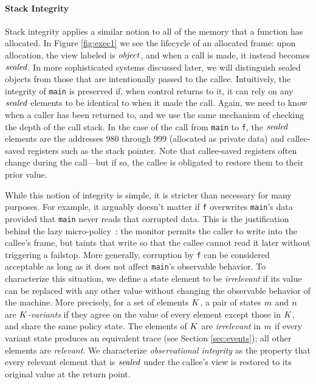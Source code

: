 \documentclass[10pt,conference]{ieeetran}%
\theoremstyle{definition}
\begin{document}
\paragraph*{Stack Integrity}

Stack integrity applies a similar  notion to all of the memory that a function has
allocated. In Figure \ref{fig:exec1} we see the lifecycle of an allocated frame:
upon allocation, the view labeled is \(\mathit{object}\), and when a call is made, it instead
becomes \(\mathit{sealed}\). In more sophisticated systems discussed later, we will distinguish
sealed objects from those that are intentionally passed to the callee. 
Intuitively, the integrity of {\tt main}
is preserved if, when control returns to it, it can rely on any \(\mathit{sealed}\) elements
to be identical to when it made the call.
%
Again, we need to know when a caller has been returned to,
and we use the same mechanism of checking the depth of the call stack.
%
In the case of the call from {\tt main} to {\tt f}, the \(\mathit{sealed}\) elements are the
addresses 980 through 999 (allocated as private data) and callee-saved registers such as
the stack pointer. Note that callee-saved registers often change
during the call---but if so, the callee is obligated to restore them to their prior value.

While this notion of integrity is simple, it is stricter than necessary for many purposes.
For example, it arguably doesn't matter if {\tt f} overwrites {\tt main}'s data provided that {\tt main} never
reads that corrupted data.  This is the justification behind the lazy micro-policy~\cite{??}:
the monitor permits the caller to write into the
callee's frame, but taints that write so that the callee cannot read it later without
triggering a failstop. More generally, corruption by {\tt f} can be considered acceptable
as long as it does not affect {\tt main}'s observable behavior. 
To characterize this situation, we define a state element to be \emph{irrelevant}
if its value can be replaced with any other value without changing the observable behavior
of the machine. More precisely, for a set of elements \(K\),
a pair of states \(m\) and \(n\)
are {\em \(K\)-variants} if they agree on the value of every
element except those in \(K\), and share the same policy state.
The elements of \(K\) are \emph{irrelevant} in \(m\) if every variant state produces an equivalent trace
(see Section \ref{sec:events}); all other elements are \emph{relevant}.
We characterize \emph{observational integrity} as the property that
every relevant element that is \(\mathit{sealed}\) under the callee's view is restored
to its original value at the return point.
\end{document}
